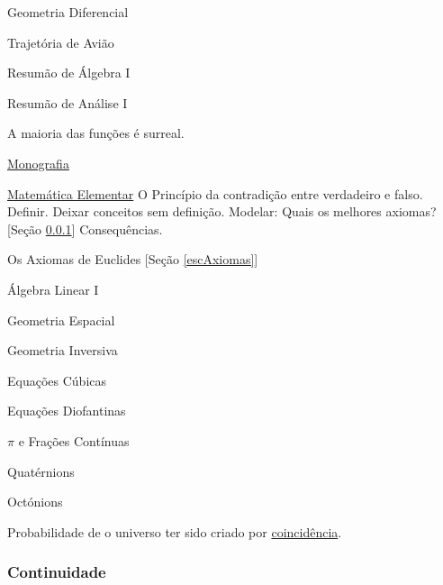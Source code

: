\documentclass[12pt,a4paper]{article}
\begin{document}
			Geometria Diferencial \cite{igd}

			Trajet\'oria de Avi\~ao \cite{aviao}

			Resum\~ao de \'Algebra I \cite{alg1}

			Resum\~ao de An\'alise I \cite{an1}

			A maioria \cite{metricos} das fun\c{c}\~oes \'e surreal.

			\begin{flushright}
			\end{flushright}

			\href{https://github.com/boralaemcasa/propagation/tree/master/webs%20dot%20com/math/Vinicius_Monografia.pdf}{Monografia}

			\underline{Matem\'atica Elementar} \cite{elementar}
			O Princ\'ipio da contradi\c{c}\~ao entre verdadeiro e falso.
			Definir.
			Deixar conceitos sem defini\c{c}\~ao.
			Modelar: Quais os melhores axiomas? [Se\c{c}\~ao \ref{continuidade}]
			Consequ\^encias.

			\begin{flushright}
			\end{flushright}

			Os Axiomas \cite{euclides} de Euclides [Se\c{c}\~ao \ref{escAxiomas}]

			\'Algebra Linear I \cite{linear1}

			Geometria Espacial \cite{espacial}

			\begin{flushright}
			\end{flushright}

			Geometria Inversiva \cite{inversiva}

			Equa\c{c}\~oes C\'ubicas \cite{cubicas}

			Equa\c{c}\~oes Diofantinas \cite{diofantinas}

			$ \pi $ e Fra\c{c}\~oes Cont\'inuas \cite{fracoes}

			Quat\'ernions \cite{Quaternions}

			Oct\'onions \cite{octonions}

			Probabilidade de o universo ter sido criado por \href{http://www.creationofuniverse.com/html/equilibrium03.html}{coincid\^encia}.

			\subsubsection{Continuidade}\label{continuidade}
			\begin{flushright}
			\end{flushright}
\end{document}
